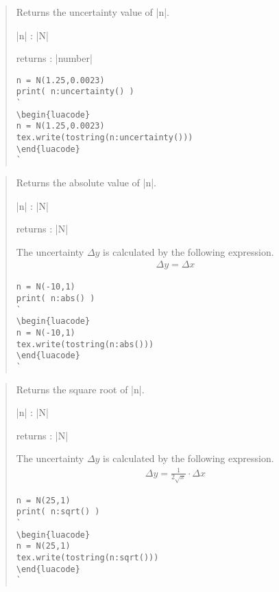 \documentclass{ltxdoc}
\begin{document}
\begin{quote}
  Returns the uncertainty value of |n|.

  \begin{description}
  \item |n| : |N|

  \item returns : |number|
  \end{description}

\begin{lstlisting}
n = N(1.25,0.0023)
print( n:uncertainty() )
`
\begin{luacode}
n = N(1.25,0.0023)
tex.write(tostring(n:uncertainty()))
\end{luacode}
`
\end{lstlisting}

\end{quote}


\begin{quote}
  Returns the absolute value of |n|.

  \begin{description}
  \item |n| : |N|

  \item returns : |N|
  \end{description}

  The uncertainty $\Delta y$ is calculated by the following expression.
  \begin{align*}
    \Delta y = \Delta x
  \end{align*}

\begin{lstlisting}
n = N(-10,1)
print( n:abs() )
`
\begin{luacode}
n = N(-10,1)
tex.write(tostring(n:abs()))
\end{luacode}
`
\end{lstlisting}

\end{quote}


\begin{quote}
  Returns the square root of |n|.

  \begin{description}
  \item |n| : |N|

  \item returns : |N|
  \end{description}

  The uncertainty $\Delta y$ is calculated by the following expression.
  \begin{align*}
    \Delta y = \frac{1}{2 \sqrt{x}} \cdot \Delta x
  \end{align*}

\begin{lstlisting}
n = N(25,1)
print( n:sqrt() )
`
\begin{luacode}
n = N(25,1)
tex.write(tostring(n:sqrt()))
\end{luacode}
`
\end{lstlisting}

\end{quote}
\end{document}
